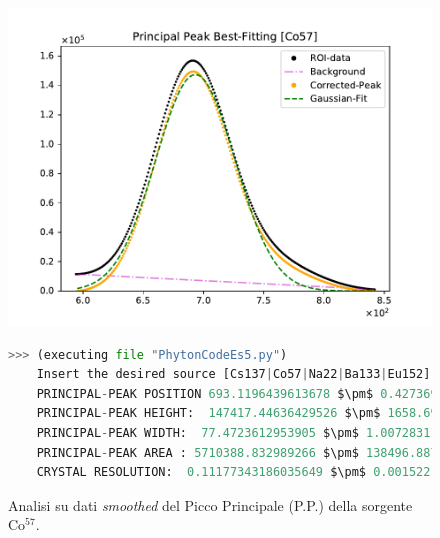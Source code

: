 \begin{figure}[h!]
	\centering
	\caption{Analisi su dati \emph{smoothed} del Picco Principale (P.P.) della sorgente Co$^{57}$. }
	\includegraphics[width =  \textwidth,trim={1cm 0 1cm 0}, clip]{Immagini/Peak-Fitting_Co57.pdf}
	\label{fig:PPCo57} \bigskip\bigskip
	\begin{lstlisting}[language=python, style=Pystyle, mathescape=true]
	>>> (executing file "PhytonCodeEs5.py")
	Insert the desired source [Cs137|Co57|Na22|Ba133|Eu152]: Co57
	PRINCIPAL-PEAK POSITION 693.1196439613678 $\pm$ 0.42736955821149747
	PRINCIPAL-PEAK HEIGHT:  147417.44636429526 $\pm$ 1658.6905056705684
	PRINCIPAL-PEAK WIDTH:  77.4723612953905 $\pm$ 1.007283111318557
	PRINCIPAL-PEAK AREA : 5710388.832989266 $\pm$ 138496.887084504
	CRYSTAL RESOLUTION:  0.11177343186035649 $\pm$ 0.0015221782887043748
	\end{lstlisting}\bigskip\bigskip
\end{figure}

\newpage

